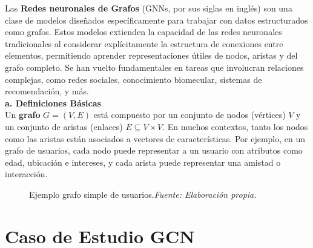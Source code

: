 \documentclass[11pt]{article} %
\begin{document}
\vspace{5pt}
Las \textbf{Redes neuronales de Grafos} (GNNs, por sus siglas en inglés) son una clase de modelos diseñados específicamente para trabajar con datos estructurados como grafos. Estos modelos extienden la capacidad de las redes neuronales tradicionales al considerar explícitamente la estructura de conexiones entre elementos, permitiendo aprender representaciones útiles de nodos, aristas y del grafo completo. Se han vuelto fundamentales en tareas que involucran relaciones complejas, como redes sociales, conocimiento biomecular, sistemas de recomendación, y más. \\[3pt]
\textbf{a. Definiciones Básicas} \\[3pt]
Un \textbf{grafo} $G = (V, E)$ está compuesto por un conjunto de nodos (vértices) $V$ y un conjunto de aristas (enlaces) $E \subseteq V \times V$. En muchos contextos, tanto los nodos como las aristas están asociados a vectores de características. Por ejemplo, en un grafo de usuarios, cada nodo puede representar a un usuario con atributos como edad, ubicación e intereses, y cada arista puede representar una amistad o interacción.
\begin{figure}[h]
\centering
{}
\caption{Ejemplo grafo simple de usuarios.\textit{Fuente: Elaboración propia.}}
\label{fig:grafo_simple}
\end{figure}

\newpage 
{\section{Caso de Estudio GCN}} \vspace{10pt}
\end{document}
